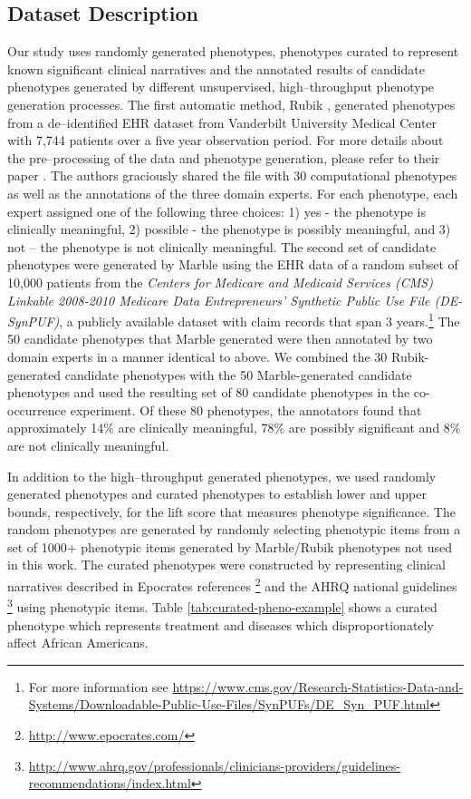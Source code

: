 \documentclass{sig-alternate-05-2015}
\begin{document}
\subsection{Dataset Description}
Our study uses randomly generated phenotypes, phenotypes curated to represent known significant clinical narratives and the annotated results of candidate phenotypes generated by different unsupervised, high--throughput phenotype generation processes. The first automatic method, Rubik \cite{wang2015rubik},
generated phenotypes from a de--identified EHR dataset from Vanderbilt University Medical Center with 7,744 patients over a five year observation period.
For more details about the pre--processing of the data and phenotype generation, please refer to their paper \cite{wang2015rubik}.
The authors graciously shared the file with 30 computational phenotypes as well as the annotations of the three domain experts.
For each phenotype, each expert assigned one of the following three choices: 1) yes - the phenotype is clinically meaningful, 2) possible - the phenotype is possibly meaningful, and 3) not -- the phenotype is not clinically meaningful.
The second set of candidate phenotypes were generated by Marble \cite{Ho:2014da} using the EHR data of a random subset of 10,000 patients from the \emph{ Centers for Medicare and Medicaid Services (CMS) Linkable 2008-2010 Medicare Data Entrepreneurs' Synthetic Public Use File (DE-SynPUF)}, a publicly available dataset with claim records that span 3 years.\footnote{For more information see \url{https://www.cms.gov/Research-Statistics-Data-and-Systems/Downloadable-Public-Use-Files/SynPUFs/DE_Syn_PUF.html}}
The 50 candidate phenotypes that Marble generated were then annotated by two domain experts in a manner identical to above.
We combined the 30 Rubik-generated candidate phenotypes with the 50 Marble-generated candidate phenotypes and used the resulting set of 80 candidate phenotypes in the co-occurrence experiment.
Of these 80 phenotypes,  the annotators found that approximately 14\% are clinically meaningful, 78\% are possibly significant and 8\% are not clinically meaningful.

In addition to the high--throughput generated phenotypes, we used randomly generated phenotypes and curated phenotypes to establish lower and upper bounds, respectively, for the lift score that measures phenotype significance. The random phenotypes are generated by randomly selecting phenotypic items from a set of 1000+ phenotypic items generated by Marble/Rubik phenotypes not used in this work. The curated phenotypes were constructed by representing clinical narratives described in Epocrates references \footnote{\url{http://www.epocrates.com/}} and the AHRQ national guidelines \footnote{\url{http://www.ahrq.gov/professionals/clinicians-providers/guidelines-recommendations/index.html}} using phenotypic items. Table \ref{tab:curated-pheno-example} shows a curated phenotype which represents treatment and diseases which disproportionately affect African Americans.
\end{document}
